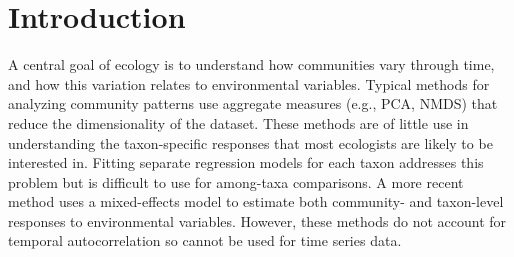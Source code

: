 

\section*{Introduction}


A central goal of ecology is to understand how communities vary through time, and
how this variation relates to environmental variables.
Typical methods for analyzing community patterns use aggregate measures (e.g., PCA, NMDS)
that reduce the dimensionality of the dataset.
These methods are of little use in understanding the taxon-specific responses
that most ecologists are likely to be interested in.
Fitting separate regression models for each taxon addresses this problem but
is difficult to use for among-taxa comparisons.
A more recent method uses a mixed-effects model to estimate both
community- and taxon-level responses to environmental variables.
However, these methods do not account for temporal autocorrelation so cannot be used
for time series data.




